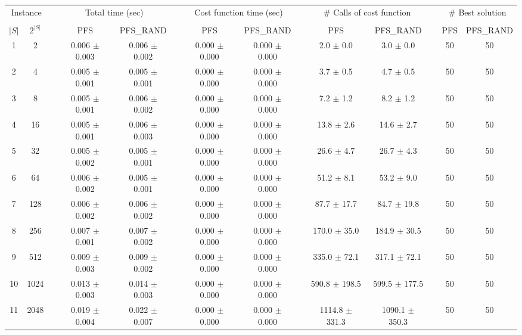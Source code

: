 \documentclass[11pt]{article}
\begin{document}
\begin{table}
\centering
\footnotesize
\begin{tabular}{cccccccccccccc}
\toprule
\multicolumn{2}{c}{Instance} & \phantom{} & \multicolumn{2}{c}{Total time (sec)}  & \phantom{} & \multicolumn{2}{c}{Cost function time (sec)}  & \phantom{} & \multicolumn{2}{c}{\# Calls of cost function}  & \phantom{} & \multicolumn{2}{c}{\# Best solution}\\
\cline{1-2}\cline{4-5}\cline{7-8}\cline{10-11}\cline{13-14} \\
$|S|$ & $2^{|S|}$ && PFS & PFS_RAND && PFS & PFS_RAND && PFS & PFS_RAND && PFS & PFS_RAND \\
 1 &       2 &&  0.006 $\pm$ 0.003 & 0.006 $\pm$ 0.002 &&  0.000 $\pm$ 0.000 & 0.000 $\pm$ 0.000 &&   2.0 $\pm$  0.0 &  3.0 $\pm$  0.0 && 50& 50\\
 2 &       4 &&  0.005 $\pm$ 0.001 & 0.005 $\pm$ 0.001 &&  0.000 $\pm$ 0.000 & 0.000 $\pm$ 0.000 &&   3.7 $\pm$  0.5 &  4.7 $\pm$  0.5 && 50& 50\\
 3 &       8 &&  0.005 $\pm$ 0.001 & 0.006 $\pm$ 0.002 &&  0.000 $\pm$ 0.000 & 0.000 $\pm$ 0.000 &&   7.2 $\pm$  1.2 &  8.2 $\pm$  1.2 && 50& 50\\
 4 &      16 &&  0.005 $\pm$ 0.001 & 0.006 $\pm$ 0.003 &&  0.000 $\pm$ 0.000 & 0.000 $\pm$ 0.000 &&  13.8 $\pm$  2.6 & 14.6 $\pm$  2.7 && 50& 50\\
 5 &      32 &&  0.005 $\pm$ 0.002 & 0.005 $\pm$ 0.001 &&  0.000 $\pm$ 0.000 & 0.000 $\pm$ 0.000 &&  26.6 $\pm$  4.7 & 26.7 $\pm$  4.3 && 50& 50\\
 6 &      64 &&  0.006 $\pm$ 0.002 & 0.005 $\pm$ 0.001 &&  0.000 $\pm$ 0.000 & 0.000 $\pm$ 0.000 &&  51.2 $\pm$  8.1 & 53.2 $\pm$  9.0 && 50& 50\\
 7 &     128 &&  0.006 $\pm$ 0.002 & 0.006 $\pm$ 0.002 &&  0.000 $\pm$ 0.000 & 0.000 $\pm$ 0.000 &&  87.7 $\pm$ 17.7 & 84.7 $\pm$ 19.8 && 50& 50\\
 8 &     256 &&  0.007 $\pm$ 0.001 & 0.007 $\pm$ 0.002 &&  0.000 $\pm$ 0.000 & 0.000 $\pm$ 0.000 &&  170.0 $\pm$ 35.0 & 184.9 $\pm$ 30.5 && 50& 50\\
 9 &     512 &&  0.009 $\pm$ 0.003 & 0.009 $\pm$ 0.002 &&  0.000 $\pm$ 0.000 & 0.000 $\pm$ 0.000 &&  335.0 $\pm$ 72.1 & 317.1 $\pm$ 72.1 && 50& 50\\
10 &    1024 &&  0.013 $\pm$ 0.003 & 0.014 $\pm$ 0.003 &&  0.000 $\pm$ 0.000 & 0.000 $\pm$ 0.000 &&  590.8 $\pm$ 198.5 & 599.5 $\pm$ 177.5 && 50& 50\\
11 &    2048 &&  0.019 $\pm$ 0.004 & 0.022 $\pm$ 0.007 &&  0.000 $\pm$ 0.000 & 0.000 $\pm$ 0.000 &&  1114.8 $\pm$ 331.3 & 1090.1 $\pm$ 350.3 && 50& 50\\

\end{tabular}
\end{table}
\end{document}
